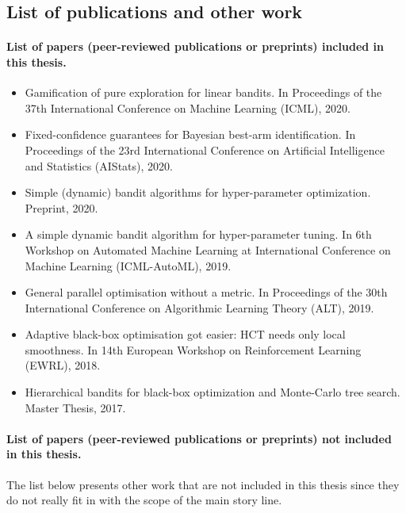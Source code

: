 \subsection{List of publications and other work}\label{sec:intro.contributions.list}

\paragraph{List of papers (peer-reviewed publications or preprints) included in this thesis.}

\begin{itemize}[label=]
    \item Gamification of pure exploration for linear bandits. In Proceedings of the 37th International Conference on Machine Learning (ICML), 2020.~\citep{degenne2020game}
    \item Fixed-confidence guarantees for Bayesian best-arm identification. In Proceedings of the 23rd International Conference on Artificial Intelligence and Statistics (AIStats), 2020.\citep{shang2020t3c}
    \item Simple (dynamic) bandit algorithms for hyper-parameter optimization. Preprint, 2020.~\citep{shang2020dttts}
    \item A simple dynamic bandit algorithm for hyper-parameter tuning. In 6th Workshop on Automated Machine Learning at International Conference on Machine Learning (ICML-AutoML), 2019.~\citep{shang2019dttts}
    \item General parallel optimisation without a metric. In Proceedings of the 30th International Conference on Algorithmic Learning Theory (ALT), 2019.~\citep{shang2019adaptive}
    \item Adaptive black-box optimisation got easier: HCT needs only local smoothness. In 14th European Workshop on Reinforcement Learning (EWRL), 2018.~\citep{shang2018adaptive}
    \item Hierarchical bandits for black-box optimization and Monte-Carlo tree search. Master Thesis, 2017.~\citep{shang2017master}
\end{itemize}

\paragraph{List of papers (peer-reviewed publications or preprints) not included in this thesis.}

The list below presents other work that are not included in this thesis since they do not really fit in with the scope of the main story line.

